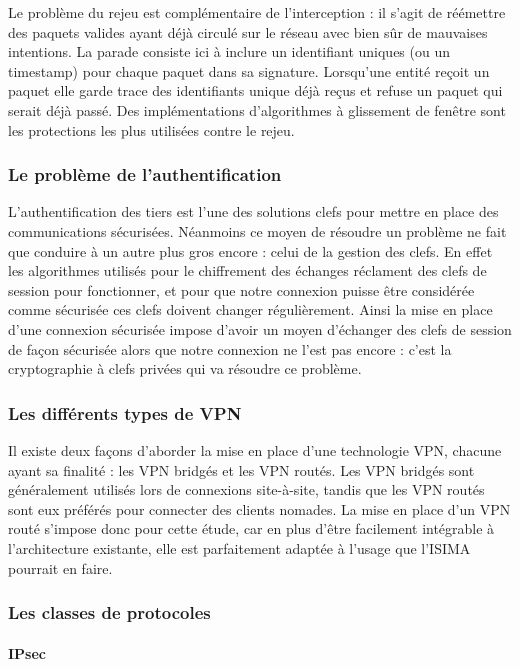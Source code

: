 Le problème du rejeu est complémentaire de l'interception : il s'agit de réémettre des paquets valides ayant déjà circulé sur le réseau avec bien sûr de mauvaises intentions. La parade consiste ici à inclure un identifiant uniques (ou un timestamp) pour chaque paquet dans sa signature. Lorsqu'une entité reçoit un paquet elle garde trace des identifiants unique déjà reçus et refuse un paquet qui serait déjà passé. Des implémentations d'algorithmes à glissement de fenêtre sont les protections les plus utilisées contre le rejeu.

\subsubsection{Le problème de l'authentification}

L'authentification des tiers est l'une des solutions clefs pour mettre en place des communications sécurisées. Néanmoins ce moyen de résoudre un problème ne fait que conduire à un autre plus gros encore : celui de la gestion des clefs. En effet les algorithmes utilisés pour le chiffrement des échanges réclament des clefs de session pour fonctionner, et pour que notre connexion puisse être considérée comme sécurisée ces clefs doivent changer régulièrement. Ainsi la mise en place d'une connexion sécurisée impose d'avoir un moyen d'échanger des clefs de session de façon sécurisée alors que notre connexion ne l'est pas encore : c'est la cryptographie à clefs privées qui va résoudre ce problème.



\subsubsection{Les différents types de VPN}

Il existe deux façons d'aborder la mise en place d'une technologie VPN, chacune ayant sa finalité : les VPN bridgés et les VPN routés. Les VPN bridgés sont généralement utilisés lors de connexions site-à-site, tandis que les VPN routés sont eux préférés pour connecter des clients nomades. La mise en place d'un VPN routé s'impose donc pour cette étude, car en plus d'être facilement intégrable à l'architecture existante, elle est parfaitement adaptée à l'usage que l'ISIMA pourrait en faire.

\subsubsection{Les classes de protocoles}
\paragraph{IPsec}
~

